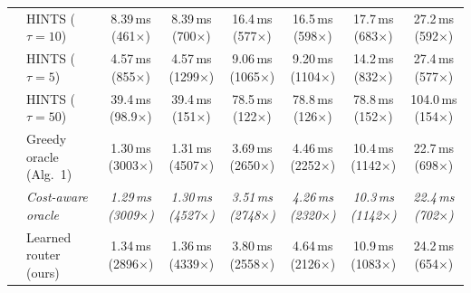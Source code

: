 {\begin{tabular}{llcccccc}
 & HINTS ($\tau{=}10$) & 8.39\,ms (461$\times$) & 8.39\,ms (700$\times$) & 16.4\,ms (577$\times$) & 16.5\,ms (598$\times$) & 17.7\,ms (683$\times$) & 27.2\,ms (592$\times$) \\
 & HINTS ($\tau{=}5$) & 4.57\,ms (855$\times$) & 4.57\,ms (1299$\times$) & 9.06\,ms (1065$\times$) & 9.20\,ms (1104$\times$) & 14.2\,ms (832$\times$) & 27.4\,ms (577$\times$) \\
 & HINTS ($\tau{=}50$) & 39.4\,ms (98.9$\times$) & 39.4\,ms (151$\times$) & 78.5\,ms (122$\times$) & 78.8\,ms (126$\times$) & 78.8\,ms (152$\times$) & 104.0\,ms (154$\times$) \\
 & Greedy oracle (Alg.~1) & 1.30\,ms (3003$\times$) & 1.31\,ms (4507$\times$) & 3.69\,ms (2650$\times$) & 4.46\,ms (2252$\times$) & 10.4\,ms (1142$\times$) & 22.7\,ms (698$\times$) \\
 & \textit{Cost-aware oracle} & \textit{1.29\,ms (3009$\times$)} & \textit{1.30\,ms (4527$\times$)} & \textit{3.51\,ms (2748$\times$)} & \textit{4.26\,ms (2320$\times$)} & \textit{10.3\,ms (1142$\times$)} & \textit{22.4\,ms (702$\times$)} \\
 & Learned router (ours) & 1.34\,ms (2896$\times$) & 1.36\,ms (4339$\times$) & 3.80\,ms (2558$\times$) & 4.64\,ms (2126$\times$) & 10.9\,ms (1083$\times$) & 24.2\,ms (654$\times$) \\
\bottomrule
\end{tabular}}
